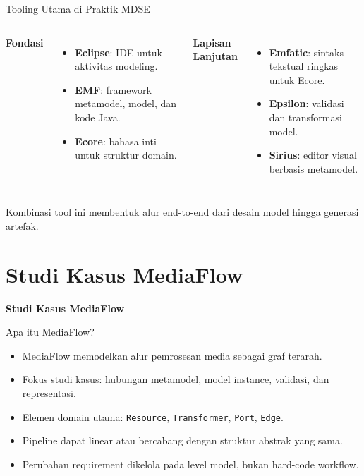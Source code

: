 \documentclass[aspectratio=169, table]{beamer}
\begin{document}
\begin{frame}{Tooling Utama di Praktik MDSE}
\vspace{4pt}
\begin{columns}[T]
\textbf{Fondasi}
\begin{itemize}
  \item \textbf{Eclipse}: IDE untuk aktivitas modeling.
  \item \textbf{EMF}: framework metamodel, model, dan kode Java.
  \item \textbf{Ecore}: bahasa inti untuk struktur domain.
\end{itemize}

\textbf{Lapisan Lanjutan}
\begin{itemize}
  \item \textbf{Emfatic}: sintaks tekstual ringkas untuk Ecore.
  \item \textbf{Epsilon}: validasi dan transformasi model.
  \item \textbf{Sirius}: editor visual berbasis metamodel.
\end{itemize}
\end{columns}

\vspace{8pt}
\small
Kombinasi tool ini membentuk alur end-to-end dari desain model hingga generasi artefak.
\end{frame}

\section{Studi Kasus MediaFlow}
\begin{frame}{\hfill}
	\centering
	\Huge{\textbf{Studi Kasus MediaFlow}}
\end{frame}

\begin{frame}{Apa itu MediaFlow?}
\vspace{6pt}
\begin{itemize}
  \item MediaFlow memodelkan alur pemrosesan media sebagai graf terarah.
  \item Fokus studi kasus: hubungan metamodel, model instance, validasi, dan representasi.
  \item Elemen domain utama: \texttt{Resource}, \texttt{Transformer}, \texttt{Port}, \texttt{Edge}.
  \item Pipeline dapat linear atau bercabang dengan struktur abstrak yang sama.
  \item Perubahan requirement dikelola pada level model, bukan hard-code workflow.
\end{itemize}
\end{frame}
\end{document}
